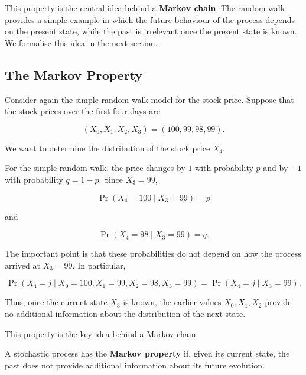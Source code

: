 \documentclass[
  letterpaper,
  DIV=11,
  numbers=noendperiod]{scrartcl}
\theoremstyle{definition}
\theoremstyle{remark}
\begin{document}
This property is the central idea behind a \textbf{Markov chain}. The
random walk provides a simple example in which the future behaviour of
the process depends on the present state, while the past is irrelevant
once the present state is known. We formalise this idea in the next
section.

\subsection{The Markov Property}\label{the-markov-property}

Consider again the simple random walk model for the stock price. Suppose
that the stock prices over the first four days are

\[
(X_0,X_1,X_2,X_3)=(100,99,98,99).
\]

We want to determine the distribution of the stock price \(X_4\).

For the simple random walk, the price changes by \(1\) with probability
\(p\) and by \(-1\) with probability \(q=1-p\). Since \(X_3=99\),

\[
\Pr(X_4=100\mid X_3=99)=p
\]

and

\[
\Pr(X_4=98\mid X_3=99)=q.
\]

The important point is that these probabilities do not depend on how the
process arrived at \(X_3=99\). In particular,

\[
\Pr(X_4=j\mid X_0=100,X_1=99,X_2=98,X_3=99)
=\Pr(X_4=j\mid X_3=99).
\]

Thus, once the current state \(X_3\) is known, the earlier values
\(X_0,X_1,X_2\) provide no additional information about the distribution
of the next state.

This property is the key idea behind a Markov chain.

\begin{tcolorbox}[enhanced jigsaw, arc=.35mm, bottomrule=.15mm, bottomtitle=1mm, breakable, colback=white, colbacktitle=quarto-callout-note-color!10!white, colframe=quarto-callout-note-color-frame, coltitle=black, left=2mm, leftrule=.75mm, opacityback=0, opacitybacktitle=0.6, rightrule=.15mm, title=\textcolor{quarto-callout-note-color}{\faInfo}\hspace{0.5em}{Key Idea}, titlerule=0mm, toprule=.15mm, toptitle=1mm]

A stochastic process has the \textbf{Markov property} if, given its
current state, the past does not provide additional information about
its future evolution.

\end{tcolorbox}
\end{document}
